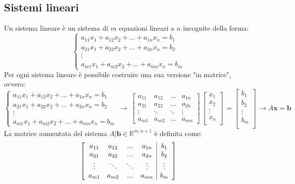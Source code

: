 \subsection{Sistemi lineari} \label{subsec:matlinear}
    Un sistema lineare è un sistema di $m$ equazioni lineari a $n$ incognite della forma:
    \[
        \begin{cases}
            a_{11}x_1 + a_{12}x_2 + ... + a_{1n}x_n = b_1 \\
            a_{21}x_1 + a_{22}x_2 + ... + a_{2n}x_n = b_2 \\
            \vdots \\
            a_{m1}x_1 + a_{m2}x_2 + ... + a_{mn}x_n = b_m
        \end{cases}
    \]
    Per ogni sistema lineare è possibile costruire una sua versione "in matrice", ovvero:
    \[
        \begin{cases}
            a_{11}x_1 + a_{12}x_2 + ... + a_{1n}x_n = b_1 \\
            a_{21}x_1 + a_{22}x_2 + ... + a_{2n}x_n = b_2 \\
            \vdots \\
            a_{m1}x_1 + a_{m2}x_2 + ... + a_{mn}x_n = b_m
        \end{cases}
        \,
        \rightarrow
        \,
        \begin{bmatrix}
            a_{11} & a_{12} & ... & a_{1n} \\
            a_{21} & a_{22} & ... & a_{2n} \\
            \vdots & \ddots & \ddots & \vdots \\
            a_{m1} & a_{m2} & ... & a_{mn}
        \end{bmatrix}
        \,
        \begin{bmatrix}
            x_{1} \\
            x_{2} \\
            \vdots \\
            x_{n} \\
        \end{bmatrix}
        \,
        =
        \begin{bmatrix}
            b_{1} \\
            b_{2} \\
            \vdots \\
            b_{m} \\
        \end{bmatrix}
        \,
        \rightarrow
        A\mathbf{x} = \mathbf{b}
    \]
    La matrice aumentata del sistema $A | \mathbf{b} \in \mathbb{R}^{m, n+1}$ è definita come:
    \[
        \left[
        \begin{array}{cccc | c}
            a_{11} & a_{12} & ... & a_{1n} & b_1 \\
            a_{21} & a_{22} & ... & a_{2n} & b_2 \\
            \vdots & \ddots & \ddots & \vdots & \vdots \\
            a_{m1} & a_{m2} & ... & a_{mn} & b_m
        \end{array}
        \right]
    \]

